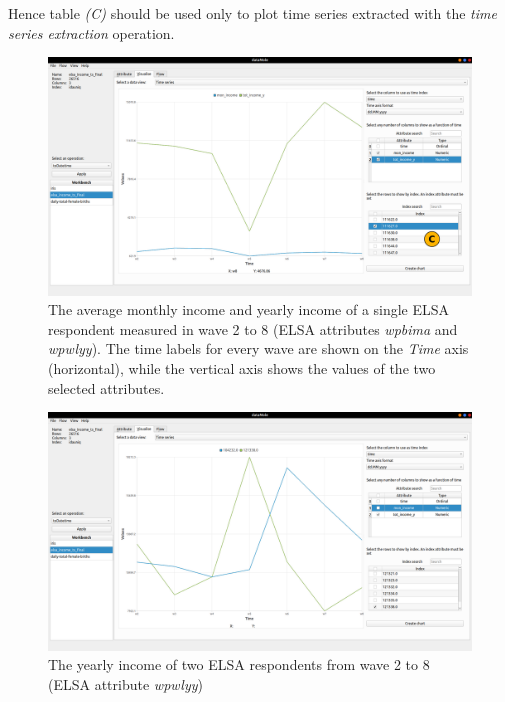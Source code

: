 Hence table \textit{(C)} should be used only to plot time series extracted with the \textit{time series extraction} operation.
\begin{figure}
	\centering
	\includegraphics[width=\textwidth]{example_ts/mon_year_income}
	\caption[The average monthly income and yearly income of a single ELSA respondent measured in wave 2 to 8]{The average monthly income and yearly income of a single ELSA respondent measured in wave 2 to 8 (ELSA attributes \textit{wpbima} and \textit{wpwlyy}). The time labels for every wave are shown on the \textit{Time} axis (horizontal), while the vertical axis shows the values of the two selected attributes.}
	\label{fig:elsa-ts-1}
\end{figure}
\begin{figure}
	\centering
	\includegraphics[width=\textwidth]{example_ts/income_y_subjects}
	\caption[The yearly income of two ELSA respondents from wave 2 to 8]{The yearly income of two ELSA respondents from wave 2 to 8 (ELSA attribute \textit{wpwlyy})}
	\label{fig:elsa-ts-2}
\end{figure}



